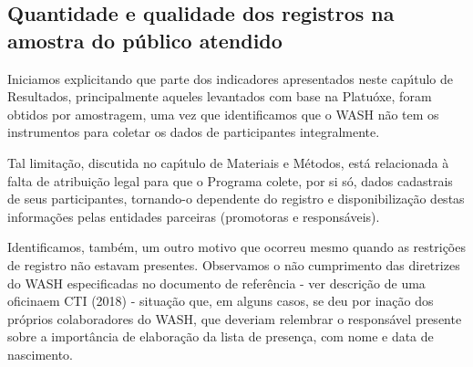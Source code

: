 \documentclass[
12pt,		%
openright,	%
twoside,  %
a4paper,			%
chapter=TITLE,		%
english,			%
french,				%
spanish,			%
brazil				%
]{USPSC-classe/USPSC}
\begin{document}
\subsection[Quantidade e qualidade dos registros na amostra do p\'ublico atendido]{Quantidade e qualidade dos registros na amostra do p\'ublico atendido}\label{Quantidade e qualidade dos registros na amostra do p\'ublico atendido}
Iniciamos explicitando que parte dos indicadores apresentados neste cap\'{\i}tulo de Resultados, principalmente aqueles levantados com base na Platu\'oxe, foram obtidos por amostragem, uma vez que identificamos que o WASH n\~ao tem os instrumentos para coletar os dados de participantes integralmente.

















Tal limita\c{c}\~ao, discutida no cap\'{\i}tulo de Materiais e M\'etodos, est\'a relacionada \`a falta de atribui\c{c}\~ao legal para que o Programa colete, por si s\'o, dados cadastrais de seus participantes, tornando-o dependente do registro e disponibiliza\c{c}\~ao destas informa\c{c}\~oes pelas entidades parceiras (promotoras e respons\'aveis).

















Identificamos, tamb\'em, um outro motivo que ocorreu mesmo quando as restri\c{c}\~oes de registro n\~ao estavam presentes. Observamos o n\~ao cumprimento das diretrizes do WASH especificadas no documento de refer\^encia - ver \textquotedbl descri\c{c}\~ao de uma oficina\textquotedbl  em  CTI (2018) - situa\c{c}\~ao que, em alguns casos, se deu por ina\c{c}\~ao dos pr\'oprios colaboradores do WASH, que deveriam relembrar o respons\'avel presente sobre a import\^ancia de elabora\c{c}\~ao da lista de presen\c{c}a, com nome e data de nascimento.
\end{document}
